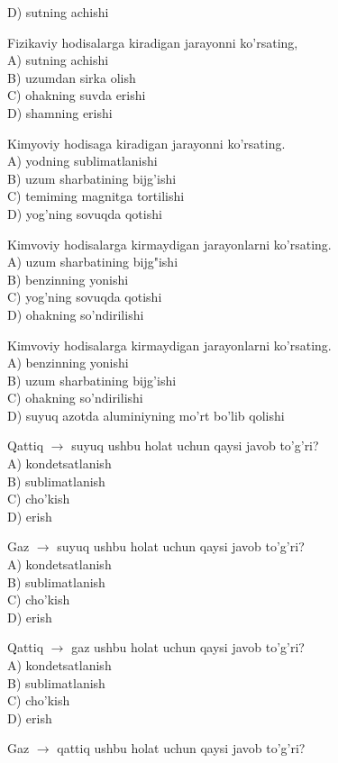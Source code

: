 D) sutning achishi
  \item Fizikaviy hodisalarga kiradigan jarayonni ko'rsating,\\
A) sutning achishi\\
B) uzumdan sirka olish\\
C) ohakning suvda erishi\\
D) shamning erishi
  \item Kimyoviy hodisaga kiradigan jarayonni ko'rsating.\\
A) yodning sublimatlanishi\\
B) uzum sharbatining bijg'ishi\\
C) temiming magnitga tortilishi\\
D) yog'ning sovuqda qotishi
  \item Kimvoviy hodisalarga kirmaydigan jarayonlarni ko'rsating.\\
A) uzum sharbatining bijg"ishi\\
B) benzinning yonishi\\
C) yog'ning sovuqda qotishi\\
D) ohakning so'ndirilishi
  \item Kimvoviy hodisalarga kirmaydigan jarayonlarni ko'rsating.\\
A) benzinning yonishi\\
B) uzum sharbatining bijg'ishi\\
C) ohakning so'ndirilishi\\
D) suyuq azotda aluminiyning mo'rt bo'lib qolishi
  \item Qattiq $\rightarrow$ suyuq ushbu holat uchun qaysi javob to'g'ri?\\
A) kondetsatlanish\\
B) sublimatlanish\\
C) cho'kish\\
D) erish
  \item Gaz $\rightarrow$ suyuq ushbu holat uchun qaysi javob to'g'ri?\\
A) kondetsatlanish\\
B) sublimatlanish\\
C) cho'kish\\
D) erish
  \item Qattiq $\rightarrow$ gaz ushbu holat uchun qaysi javob to'g'ri?\\
A) kondetsatlanish\\
B) sublimatlanish\\
C) cho'kish\\
D) erish
  \item Gaz $\rightarrow$ qattiq ushbu holat uchun qaysi javob to'g'ri?\\
